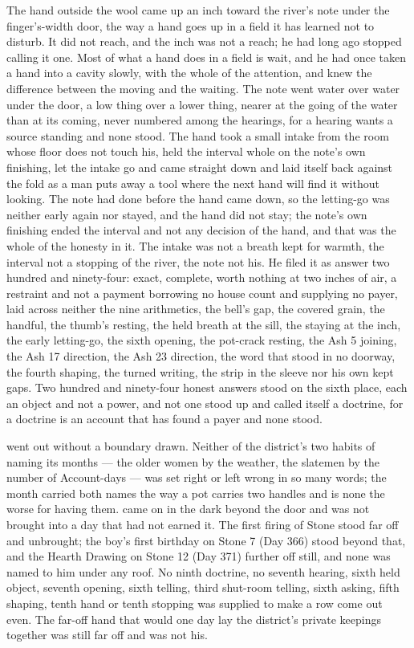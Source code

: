 The hand outside the wool came up an inch toward the river's note under the finger's-width door, the way a hand goes up in a field it has learned not to disturb. It did not reach, and the inch was not a reach; he had long ago stopped calling it one. Most of what a hand does in a field is wait, and he had once taken a hand into a cavity slowly, with the whole of the attention, and knew the difference between the moving and the waiting. The note went water over water under the door, a low thing over a lower thing, nearer at the going of the water than at its coming, never numbered among the hearings, for a hearing wants a source standing and none stood. The hand took a small intake from the room whose floor does not touch his, held the interval whole on the note's own finishing, let the intake go and came straight down and laid itself back against the fold as a man puts away a tool where the next hand will find it without looking. The note had done before the hand came down, so the letting-go was neither early again nor stayed, and the hand did not stay; the note's own finishing ended the interval and not any decision of the hand, and that was the whole of the honesty in it. The intake was not a breath kept for warmth, the interval not a stopping of the river, the note not his. He filed it as answer two hundred and ninety-four: exact, complete, worth nothing at two inches of air, a restraint and not a payment borrowing no house count and supplying no payer, laid across neither the nine arithmetics, the bell's gap, the covered grain, the handful, the thumb's resting, the held breath at the sill, the staying at the inch, the early letting-go, the sixth opening, the pot-crack resting, the Ash 5 joining, the Ash 17 direction, the Ash 23 direction, the word that stood in no doorway, the fourth shaping, the turned writing, the strip in the sleeve nor his own kept gaps. Two hundred and ninety-four honest answers stood on the sixth place, each an object and not a power, and not one stood up and called itself a doctrine, for a doctrine is an account that has found a payer and none stood.

 went out without a boundary drawn. Neither of the district's two habits of naming its months --- the older women by the weather, the slatemen by the number of Account-days --- was set right or left wrong in so many words; the month carried both names the way a pot carries two handles and is none the worse for having them.  came on in the dark beyond the door and was not brought into a day that had not earned it. The first firing of Stone stood far off and unbrought; the boy's first birthday on Stone 7 (Day 366) stood beyond that, and the Hearth Drawing on Stone 12 (Day 371) further off still, and none was named to him under any roof. No ninth doctrine, no seventh hearing, sixth held object, seventh opening, sixth telling, third shut-room telling, sixth asking, fifth shaping, tenth hand or tenth stopping was supplied to make a row come out even. The far-off hand that would one day lay the district's private keepings together was still far off and was not his.

